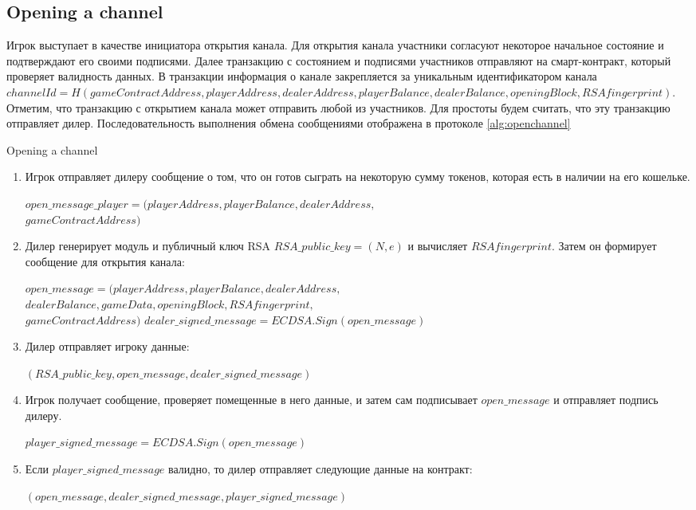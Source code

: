 		\subsection {Opening a channel}
Игрок выступает в качестве инициатора открытия канала. Для открытия канала участники согласуют некоторое начальное состояние и подтверждают его своими подписями. Далее транзакцию с состоянием и подписями участников отправляют на смарт-контракт, который проверяет валидность данных. В транзакции информация о канале закрепляется за уникальным идентификатором канала $channelId = H(gameContractAddress, playerAddress, dealerAddress, playerBalance, dealerBalance, openingBlock, RSAfingerprint)$. Отметим, что транзакцию с открытием канала может отправить любой из участников. Для простоты будем считать, что эту транзакцию отправляет дилер. Последовательность выполнения обмена сообщениями отображена в протоколе \autoref {alg:openchannel}
\begin{algorithm}
\caption{Opening a channel} \label{alg:openchannel}
\begin{enumerate}
	\item Игрок отправляет дилеру сообщение о том, что он готов сыграть на некоторую сумму токенов, которая есть в наличии на его кошельке.
\begin{center}
	 $open\_message\_player = (playerAddress, playerBalance, dealerAddress,$\\$ gameContractAddress)$
\end{center}
	\item Дилер генерирует модуль и публичный ключ RSA $RSA\_public\_key= (N,e)$ и вычисляет $RSAfingerprint$. Затем он формирует сообщение для открытия канала:
\begin{center}
	 $open\_message = (playerAddress,  playerBalance, dealerAddress,$\\$dealerBalance, gameData, openingBlock, RSAfingerprint,$\\$gameContractAddress)$
	$dealer\_signed\_message = ECDSA.Sign(open\_message)$
\end{center}
	\item Дилер отправляет игроку данные:
\begin{center}
$(RSA\_public\_key, open\_message,dealer\_signed\_message)$
\end{center}
	\item Игрок получает сообщение, проверяет помещенные в него данные, и затем сам подписывает $open\_message$ и отправляет подпись дилеру.
\begin{center}
	$player\_signed\_message = ECDSA.Sign(open\_message)$
\end{center}
	\item Если $player\_signed\_message$ валидно, то дилер отправляет следующие данные на контракт:
\begin{center}
$(open\_message,dealer\_signed\_message,player\_signed\_message)$
\end{center}
\end{enumerate}
\end{algorithm}
